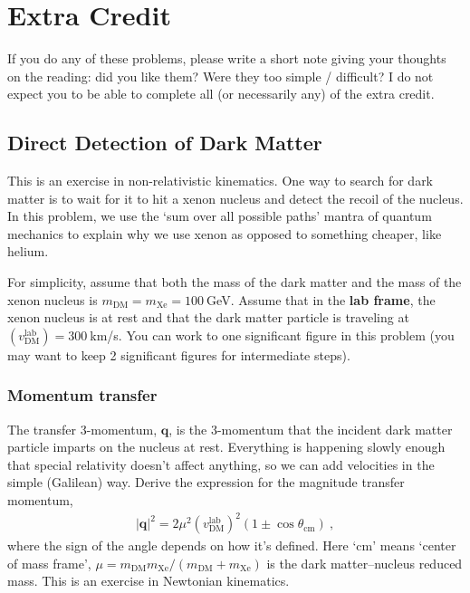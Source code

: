 \documentclass[12pt]{article}
\renewcommand{\vec}[1]{\mathbf{#1}} %
\begin{document}





\section{Extra Credit}

If you do any of these problems, please write a short note giving your thoughts on the reading: did you like them? Were they too simple / difficult? I do not expect you to be able to complete all (or necessarily any) of the extra credit.

\subsection{Direct Detection of Dark Matter}

This is an exercise in non-relativistic kinematics. One way to search for dark matter is to wait for it to hit a xenon nucleus and detect the recoil of the nucleus. In this problem, we use the `sum over all possible paths' mantra of quantum mechanics to explain why we use xenon as opposed to something cheaper, like helium. 

For simplicity, assume that both the mass of the dark matter and the mass of the xenon nucleus is $m_{\text{DM}} = m_{\text{Xe}}=100~$GeV. Assume that in the \textbf{lab frame}, the xenon nucleus is at rest and that the dark matter particle is traveling at $(v_\text{DM}^\text{lab})=300~$km/s. You can work to one significant figure in this problem (you may want to keep 2 significant figures for intermediate steps). 

\subsubsection{Momentum transfer}
The transfer 3-momentum, $\vec q$, is the 3-momentum that the incident dark matter particle imparts on the nucleus at rest. Everything is happening slowly enough that special relativity doesn't affect anything, so we can add velocities in the simple (Galilean) way. Derive the expression for the magnitude transfer momentum, 
\begin{align}
	|\vec q|^2 = 2\mu^2 (v_\text{DM}^\text{lab})^2 (1\pm \cos \theta_\text{cm}) \ ,
\end{align}
where the sign of the angle depends on how it's defined. Here `cm' means `center of mass frame', $\mu = m_{\text{DM}}m_{\text{Xe}}/(m_{\text{DM}}+m_{\text{Xe}})$ is the dark matter--nucleus reduced mass. This is an exercise in Newtonian kinematics.
\end{document}
